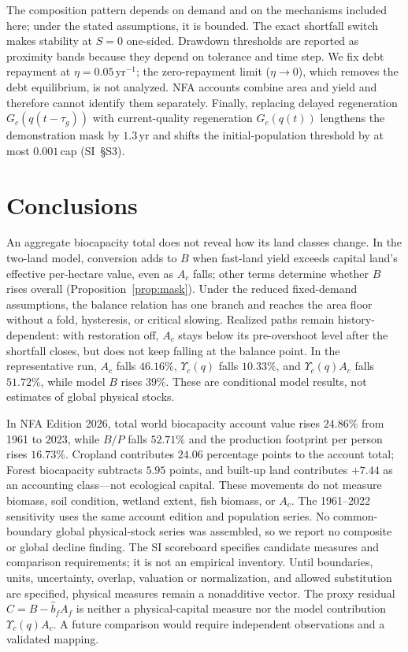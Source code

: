 \documentclass[preprint,12pt,authoryear]{elsarticle}
\newcommand{\Ups}{\Upsilon_c}
\begin{document}
The composition pattern depends on demand and on the mechanisms included here; under the stated assumptions, it is bounded. The exact shortfall switch makes stability at $S=0$ one-sided. Drawdown thresholds are reported as proximity bands because they depend on tolerance and time step. We fix debt repayment at $\eta=0.05$\,yr$^{-1}$; the zero-repayment limit ($\eta\to0$), which removes the debt equilibrium, is not analyzed. NFA accounts combine area and yield and therefore cannot identify them separately. Finally, replacing delayed regeneration $G_c(q(t-\tau_g))$ with current-quality regeneration $G_c(q(t))$ lengthens the demonstration mask by $1.3$\,yr and shifts the initial-population threshold by at most $0.001$\,cap (SI~\S S3).

\section{Conclusions}\label{sec:conclusions}

An aggregate biocapacity total does not reveal how its land classes change. In the two-land model, conversion adds to $B$ when fast-land yield exceeds capital land's effective per-hectare value, even as $A_c$ falls; other terms determine whether $B$ rises overall (Proposition~\ref{prop:mask}). Under the reduced fixed-demand assumptions, the balance relation has one branch and reaches the area floor without a fold, hysteresis, or critical slowing. Realized paths remain history-dependent: with restoration off, $A_c$ stays below its pre-overshoot level after the shortfall closes, but does not keep falling at the balance point. In the representative run, $A_c$ falls $46.16\%$, $\Ups(q)$ falls $10.33\%$, and $\Ups(q)A_c$ falls $51.72\%$, while model $B$ rises $39\%$. These are conditional model results, not estimates of global physical stocks.

In NFA Edition 2026, total world biocapacity account value rises $24.86\%$ from 1961 to 2023, while $B/P$ falls $52.71\%$ and the production footprint per person rises $16.73\%$. Cropland contributes $24.06$ percentage points to the account total; Forest biocapacity subtracts $5.95$ points, and built-up land contributes $+7.44$ as an accounting class—not ecological capital. These movements do not measure biomass, soil condition, wetland extent, fish biomass, or $A_c$. The 1961--2022 sensitivity uses the same account edition and population series. No common-boundary global physical-stock series was assembled, so we report no composite or global decline finding. The SI scoreboard specifies candidate measures and comparison requirements; it is not an empirical inventory. Until boundaries, units, uncertainty, overlap, valuation or normalization, and allowed substitution are specified, physical measures remain a nonadditive vector. The proxy residual $C=B-\hat b_fA_f$ is neither a physical-capital measure nor the model contribution $\Ups(q)A_c$. A future comparison would require independent observations and a validated mapping.
\end{document}
